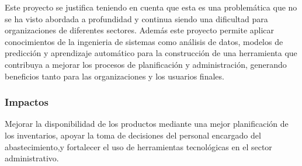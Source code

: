 Este proyecto se justifica teniendo en cuenta que esta es una problemática que no se ha visto abordada a profundidad y continua siendo una dificultad para organizaciones de diferentes sectores. Además este proyecto permite aplicar conocimientos de la ingenieria de sistemas como análisis de datos, modelos de predicción y aprendizaje automático para la construcción de una herramienta que contribuya a mejorar los procesos de planificación y administración, generando beneficios tanto para las organizaciones y los usuarios finales.

\subsubsection{Impactos}

Mejorar la disponibilidad de los productos mediante una mejor planificación de los inventarios, apoyar la toma de decisiones del personal encargado del abastecimiento,y fortalecer el uso de herramientas tecnológicas en el sector administrativo.
